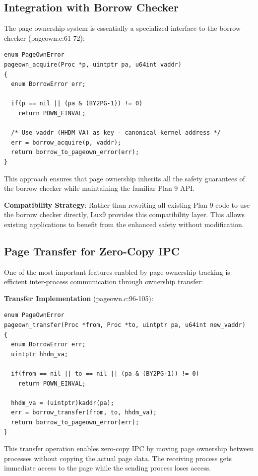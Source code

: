 \documentclass[11pt,letterpaper]{article}
\begin{document}
\subsection{Integration with Borrow Checker}

The page ownership system is essentially a specialized interface to the borrow checker (pageown.c:61-72):

\begin{lstlisting}
enum PageOwnError
pageown_acquire(Proc *p, uintptr pa, u64int vaddr)
{
  enum BorrowError err;

  if(p == nil || (pa & (BY2PG-1)) != 0)
    return POWN_EINVAL;

  /* Use vaddr (HHDM VA) as key - canonical kernel address */
  err = borrow_acquire(p, vaddr);
  return borrow_to_pageown_error(err);
}
\end{lstlisting}

This approach ensures that page ownership inherits all the safety guarantees of the borrow checker while maintaining the familiar Plan 9 API.

\textbf{Compatibility Strategy}: Rather than rewriting all existing Plan 9 code to use the borrow checker directly, Lux9 provides this compatibility layer. This allows existing applications to benefit from the enhanced safety without modification.

\subsection{Page Transfer for Zero-Copy IPC}

One of the most important features enabled by page ownership tracking is efficient inter-process communication through ownership transfer:

\textbf{Transfer Implementation} (pageown.c:96-105):

\begin{lstlisting}
enum PageOwnError
pageown_transfer(Proc *from, Proc *to, uintptr pa, u64int new_vaddr)
{
  enum BorrowError err;
  uintptr hhdm_va;

  if(from == nil || to == nil || (pa & (BY2PG-1)) != 0)
    return POWN_EINVAL;

  hhdm_va = (uintptr)kaddr(pa);
  err = borrow_transfer(from, to, hhdm_va);
  return borrow_to_pageown_error(err);
}
\end{lstlisting}

This transfer operation enables zero-copy IPC by moving page ownership between processes without copying the actual page data. The receiving process gets immediate access to the page while the sending process loses access.
\end{document}
